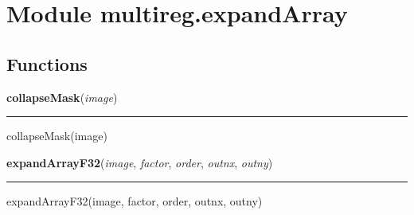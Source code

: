 %
%
%


\section{Module multireg.expandArray}

    \label{multireg:expandArray}


  \subsection{Functions}

    \label{multireg:expandArray:collapseMask}
    \vspace{0.5ex}

    \begin{boxedminipage}{\textwidth}

    \raggedright \textbf{collapseMask}(\textit{image})

    \vspace{-1.5ex}

    \rule{\textwidth}{0.5\fboxrule}
    collapseMask(image)

    \vspace{1ex}

    \end{boxedminipage}

    \label{multireg:expandArray:expandArrayF32}
    \vspace{0.5ex}

    \begin{boxedminipage}{\textwidth}

    \raggedright \textbf{expandArrayF32}(\textit{image}, \textit{factor}, \textit{order}, \textit{outnx}, \textit{outny})

    \vspace{-1.5ex}

    \rule{\textwidth}{0.5\fboxrule}
    expandArrayF32(image, factor, order, outnx, outny)

    \vspace{1ex}

    \end{boxedminipage}

